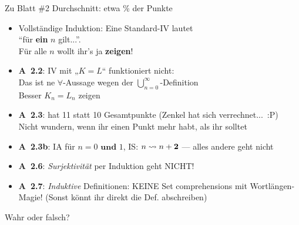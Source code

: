 




\graphicspath{{../figures/}}

\morescalingdelimiters




\begin{frame}{Zu Blatt \#2}
	Durchschnitt: etwa  \% der Punkte 
	\begin{itemize}		
		\item Vollständige Induktion: Eine Standard-IV lautet \\
		{\enquote{für \textbf{\alert{ein}} $n$ gilt...}}.\\
		Für alle $n$ wollt ihr's ja \textbf{zeigen}!
		\item \textbf{A~2.2}: IV mit „$K=L$“ funktioniert nicht: \\ 
		Das ist ne $\forall$-Aussage wegen der $\bigcup\limits^\infty_{n=0}$-Definition \\
		\impl Besser $K_n = L_n$ zeigen
		\item \textbf{A~2.3}: hat 11 statt 10 Gesamtpunkte (Zenkel hat sich verrechnet...~:P) \\
		\impl Nicht wundern, wenn ihr einen Punkt mehr habt, als ihr solltet
		\item \textbf{A~2.3b}: IA für $n=0 \textbf{ und } 1$, \; IS: $n \?> n+\mathbf{2}$ \quad --- alles andere geht nicht
		\item \textbf{A~2.6}: \emph{Surjektivität} per Induktion geht NICHT!
		\item \textbf{A~2.7}: \emph{Induktive} Definitionen: KEINE Set comprehensions mit Wortlängen-Magie! (Sonst könnt ihr direkt die Def. abschreiben)
	\end{itemize}
	
\end{frame}

\framePrevEpisode

\begin{frame}[t]{Wahr oder falsch?}
	\thasse{\Socrative}
\end{frame}

